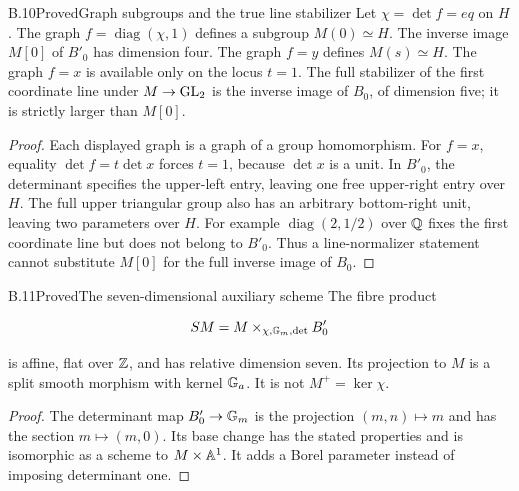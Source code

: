 \begin{statement}{B.10}{Proved}{Graph subgroups and the true line stabilizer}
Let $\chi=\det f=eq$ on $H$.
The graph $f=\operatorname{diag}(\chi,1)$ defines a subgroup
$M(0)\simeq H$. The inverse image $M[0]$ of $B'_0$ has
dimension four. The graph $f=y$ defines $M(s)\simeq H$.
The graph $f=x$ is available only on the locus $t=1$.
The full stabilizer of the first coordinate line under
$M\to\operatorname{GL}_2$ is the inverse image of $B_0$, of dimension five;
it is strictly larger than $M[0]$.
\end{statement}
\begin{proof}
Each displayed graph is a graph of a group homomorphism.
For $f=x$, equality $\det f=t\det x$ forces $t=1$,
because $\det x$ is a unit.
In $B'_0$, the determinant specifies the upper-left entry,
leaving one free upper-right entry over $H$.
The full upper triangular group also has an arbitrary
bottom-right unit, leaving two parameters over $H$.
For example $\operatorname{diag}(2,1/2)$ over $\mathbb Q$ fixes
the first coordinate line but does not belong to $B'_0$.
Thus a line-normalizer statement cannot substitute $M[0]$
for the full inverse image of $B_0$.
\end{proof}

\begin{statement}{B.11}{Proved}{The seven-dimensional auxiliary scheme}
The fibre product

$$
SM=M\times_{\chi,\mathbb G_m,\det}B'_0
$$

is affine, flat over $\mathbb Z$, and has relative dimension seven.
Its projection to $M$ is a split smooth morphism with kernel
$\mathbb G_a$. It is not $M^+=\ker\chi$.
\end{statement}
\begin{proof}
The determinant map $B'_0\to\mathbb G_m$ is the projection
$(m,n)\mapsto m$ and has the section $m\mapsto(m,0)$.
Its base change has the stated properties and is isomorphic
as a scheme to $M\times\mathbb A^1$.
It adds a Borel parameter instead of imposing determinant one.
\end{proof}

